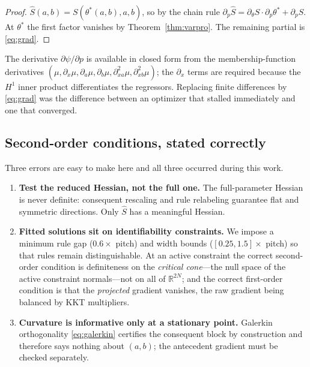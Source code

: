 \documentclass[11pt]{article}
\theoremstyle{plain}
\theoremstyle{definition}
\newcommand{\R}{\mathbb{R}}
\begin{document}
\begin{proof}
$\widehat S(a,b)=S(\theta^{*}(a,b),a,b)$, so by the chain rule
$\partial_p\widehat S=\partial_\theta S\cdot\partial_p\theta^{*}
+\partial_p S$. At $\theta^{*}$ the first factor vanishes by
Theorem~\ref{thm:varpro}. The remaining partial is \eqref{eq:grad}.
\end{proof}

The derivative $\partial\psi/\partial p$ is available in closed form from the
membership-function derivatives $(\mu,\partial_x\mu,\partial_a\mu,\partial_b\mu,
\partial^2_{xa}\mu,\partial^2_{xb}\mu)$; the $\partial_x$ terms are required
because the $H^1$ inner product differentiates the regressors. Replacing finite
differences by \eqref{eq:grad} was the difference between an optimizer that
stalled immediately and one that converged.

\subsection{Second-order conditions, stated correctly}
\label{sec:second-order}

Three errors are easy to make here and all three occurred during this work.

\begin{enumerate}
\item \textbf{Test the reduced Hessian, not the full one.} The full-parameter
Hessian is never definite: consequent rescaling and rule relabeling guarantee
flat and symmetric directions. Only $\widehat S$ has a meaningful Hessian.

\item \textbf{Fitted solutions sit on identifiability constraints.} We impose a
minimum rule gap ($0.6\times$ pitch) and width bounds ($[0.25,1.5]\times$
pitch) so that rules remain distinguishable. At an active constraint the
correct second-order condition is definiteness on the \emph{critical cone}---the
null space of the active constraint normals---not on all of $\R^{2N}$; and the
correct first-order condition is that the \emph{projected} gradient vanishes,
the raw gradient being balanced by KKT multipliers.

\item \textbf{Curvature is informative only at a stationary point.} Galerkin
orthogonality \eqref{eq:galerkin} certifies the consequent block by
construction and therefore says nothing about $(a,b)$; the antecedent gradient
must be checked separately.
\end{enumerate}
\end{document}
